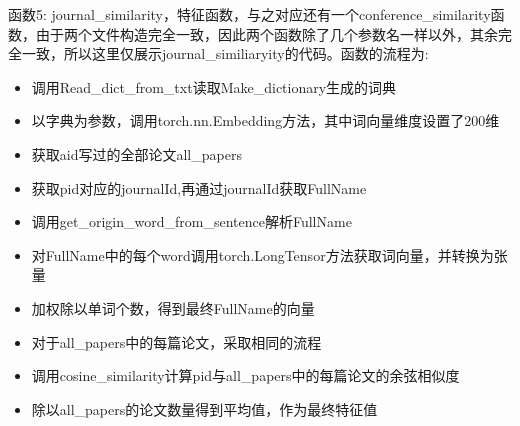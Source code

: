 \documentclass{mcmthesis}
\begin{document}
			\par 函数5: journal\_similarity，特征函数，与之对应还有一个conference\_similarity函数，由于两个文件构造完全一致，因此两个函数除了几个参数名一样以外，其余完全一致，所以这里仅展示journal\_similiaryity的代码。函数的流程为:
			\begin{itemize}
				\item 调用Read\_dict\_from\_txt读取Make\_dictionary生成的词典
				\item 以字典为参数，调用torch.nn.Embedding方法，其中词向量维度设置了200维
				\item 获取aid写过的全部论文all\_papers
				\item 获取pid对应的journalId,再通过journalId获取FullName
				\item 调用get\_origin\_word\_from\_sentence解析FullName
				\item 对FullName中的每个word调用torch.LongTensor方法获取词向量，并转换为张量
				\item 加权除以单词个数，得到最终FullName的向量
				\item 对于all\_papers中的每篇论文，采取相同的流程
				\item 调用cosine\_similarity计算pid与all\_papers中的每篇论文的余弦相似度
				\item 除以all\_papers的论文数量得到平均值，作为最终特征值
			\end{itemize}
\end{document}
